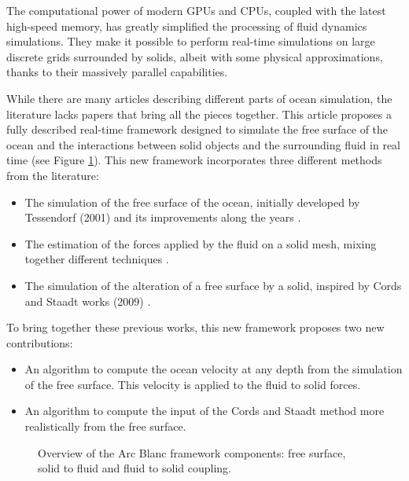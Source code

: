 \documentclass[11pt]{article}
\def\framework{the Arc Blanc framework\xspace}
\begin{document}
The computational power of modern GPUs and CPUs, coupled with the latest high-speed memory, has greatly simplified the processing of fluid dynamics simulations.
They make it possible to perform real-time simulations on large discrete grids surrounded by solids, albeit with some physical approximations, thanks to their massively parallel capabilities.

While there are many articles describing different parts of ocean simulation, the literature lacks papers that bring all the pieces together.
This article proposes a fully described real-time framework designed to simulate the free surface of the ocean and the interactions between solid objects and the surrounding fluid in real time (see Figure \ref{fig:overviewFramework}).
This new framework incorporates three different methods from the literature:
\begin{itemize}
	\item The simulation of the free surface of the ocean, initially developed by Tessendorf (2001) \cite{tessendorfSimulatingOceanWater2001} and its improvements along the years \cite{horvathEmpiricalDirectionalWave2015,tessendorfGilliganPrototypeFramework2017}.
	\item The estimation of the forces applied by the fluid on a solid mesh, mixing together different techniques \cite{yukselRealtimeWaterWaves2010,kellomakiRigidBodyInteraction2014}.
	\item The simulation of the alteration of a free surface by a solid, inspired by Cords and Staadt works (2009) \cite{cordsRealTimeOpenWater2009}.
\end{itemize}
To bring together these previous works, this new framework proposes two new contributions:
\begin{itemize}
	\item An algorithm to compute the ocean velocity at any depth from the simulation of the free surface. This velocity is applied to the fluid to solid forces.
	\item An algorithm to compute the input of the Cords and Staadt method more realistically from the free surface.
\end{itemize}



\begin{figure}
	\centering
	
	\caption{Overview of \framework components: free surface, solid to fluid and fluid to solid coupling.}
	\label{fig:overviewFramework}
\end{figure}
\end{document}
